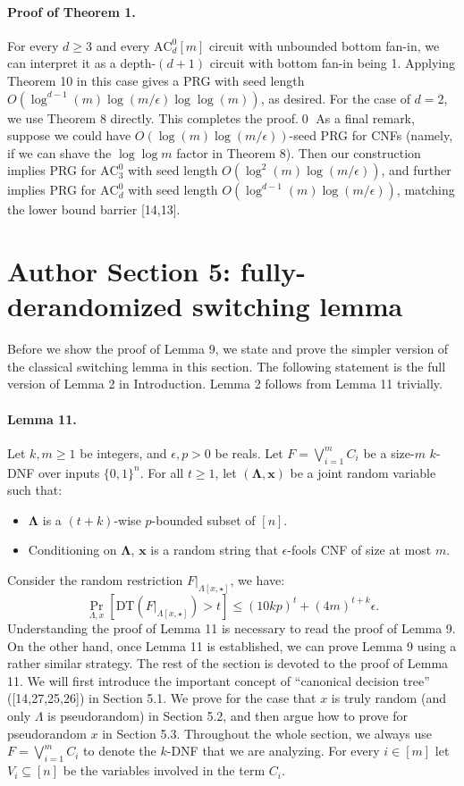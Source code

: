 \documentclass[10pt,a4paper]{article}
\begin{document}
\paragraph{Proof of Theorem 1.} For every $d\ge3$ and every $\mathrm{AC}^0_d[m]$ circuit with unbounded bottom fan-in, we can interpret it as a depth-$(d+1)$ circuit with bottom fan-in being 1. Applying Theorem 10 in this case gives a PRG with seed length $O(\log^{d-1}(m)\log(m/\epsilon)\log\log(m))$, as desired. For the case of $d=2$, we use Theorem 8 directly. This completes the proof.\qed
As a final remark, suppose we could have $O(\log(m)\log(m/\epsilon))$-seed PRG for CNFs (namely, if we can shave the $\log\log m$ factor in Theorem 8). Then our construction implies PRG for $\mathrm{AC}^0_3$ with seed length $O(\log^2(m)\log(m/\epsilon))$, and further implies PRG for $\mathrm{AC}^0_d$ with seed length $O(\log^{d-1}(m)\log(m/\epsilon))$, matching the lower bound barrier [14,13].

\section*{Author Section 5: fully-derandomized switching lemma}
Before we show the proof of Lemma 9, we state and prove the simpler version of the classical switching lemma in this section. The following statement is the full version of Lemma 2 in Introduction. Lemma 2 follows from Lemma 11 trivially.
\paragraph{Lemma 11.} Let $k,m\ge1$ be integers, and $\epsilon,p>0$ be reals. Let $F=\bigvee_{i=1}^mC_i$ be a size-$m$ $k$-DNF over inputs $\{0,1\}^n$. For all $t\ge1$, let $(\boldsymbol\Lambda,\boldsymbol x)$ be a joint random variable such that:
\begin{itemize}\item $\boldsymbol\Lambda$ is a $(t+k)$-wise $p$-bounded subset of $[n]$.
\item Conditioning on $\boldsymbol\Lambda$, $\boldsymbol x$ is a random string that $\epsilon$-fools CNF of size at most $m$.\end{itemize}
Consider the random restriction $F|_{\Lambda[x,\star]}$, we have:
\[\Pr_{\Lambda,x}[\mathrm{DT}(F|_{\Lambda[x,\star]})>t]\le(10kp)^t+(4m)^{t+k}\epsilon.\]
Understanding the proof of Lemma 11 is necessary to read the proof of Lemma 9. On the other hand, once Lemma 11 is established, we can prove Lemma 9 using a rather similar strategy. The rest of the section is devoted to the proof of Lemma 11. We will first introduce the important concept of ``canonical decision tree'' ([14,27,25,26]) in Section 5.1. We prove for the case that $x$ is truly random (and only $\Lambda$ is pseudorandom) in Section 5.2, and then argue how to prove for pseudorandom $x$ in Section 5.3. Throughout the whole section, we always use $F=\bigvee_{i=1}^mC_i$ to denote the $k$-DNF that we are analyzing. For every $i\in[m]$ let $V_i\subseteq[n]$ be the variables involved in the term $C_i$.
\end{document}

